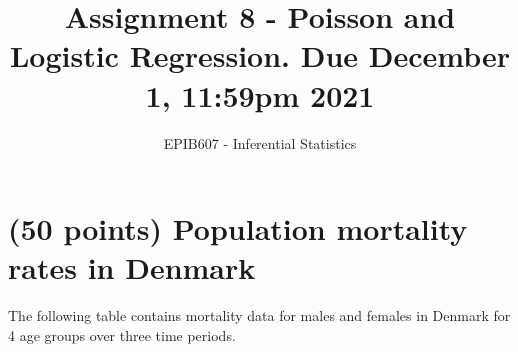 \documentclass[letterpaper,12pt,twoside,]{pinp}
\title{Assignment 8 - Poisson and Logistic Regression. Due December 1,
11:59pm 2021}
\author[a]{EPIB607 - Inferential Statistics}
\affil[a]{McGill University}
\begin{document}
\verticaladjustment{-2pt}

\maketitle
\thispagestyle{firststyle}



\hypertarget{points-population-mortality-rates-in-denmark}{%
\section{(50 points) Population mortality rates in
Denmark}\label{points-population-mortality-rates-in-denmark}}

The following table contains mortality data for males and females in
Denmark for 4 age groups over three time periods.

\vspace*{0.3in}
\end{document}
